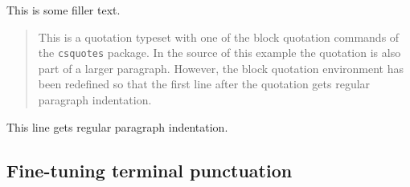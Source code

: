 \documentclass[a4paper]{article}
\newcommand*{\example}[1]{%
  \addvspace{\baselineskip}%
  \par\noindent\hspace{-4em}%
  \makebox[3em][r]{\textbf{Ex. #1}}%
  \hspace{1em}\ignorespaces}
\begin{document}
%
%

\newenvironment*{paraquote}
  {\begingroup\quote}
  {\endquote\endgroup}




\example{6}
This is some filler text. \blockquote{This is a quotation typeset with one of
the block quotation commands of the \texttt{csquotes} package. In the source
of this example the quotation is also part of a larger paragraph. However, the
block quotation environment has been redefined so that the first line after
the quotation gets regular paragraph indentation.} This line gets regular
paragraph indentation.

%
%

\subsection{Fine-tuning terminal punctuation}

% 
\end{document}
